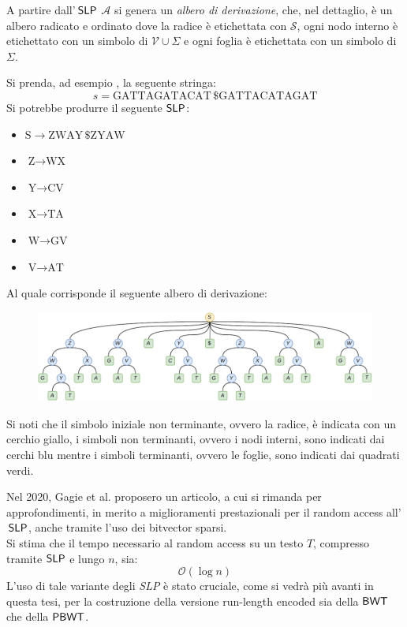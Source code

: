 A partire dall'$\,\mbox{\rm {\sf SLP}}$ $\mathcal{A}$ si genera un \textit{albero
  di derivazione}, che, nel dettaglio, è un albero radicato e ordinato
dove la radice è etichettata con $\mathcal{S}$, ogni nodo
  interno è etichettato con un simbolo di $\mathcal{V}\cup\Sigma$ e ogni foglia
è etichettata con un simbolo di $\Sigma$.
\begin{esempio}
  \label{ese:slpgagie}
  Si prenda, ad esempio \cite{slpgagie}, la seguente stringa:
  \[s=\mbox{GATTAGATACAT}\,\$\mbox{GATTACATAGAT}\]
  Si potrebbe produrre il seguente $\mbox{\rm {\sf SLP}}$:
  \begin{multicols}{3}
    \begin{itemize}
      \item $\mbox{S}\to \mbox{ZWAY}\,\$\mbox{ZYAW}$
      \item $\mbox{Z}\to \mbox{WX}$
      \item $\mbox{Y}\to \mbox{CV}$
      \item $\mbox{X}\to \mbox{TA}$
      \item $\mbox{W}\to \mbox{GV}$
      \item $\mbox{V}\to \mbox{AT}$
    \end{itemize}
  \end{multicols}
  Al quale corrisponde il seguente albero di derivazione:
  \begin{figure}[H]
    \centering
    \includegraphics[width=\textwidth]{img/slpgagie.pdf}
  \end{figure}
  Si noti che il simbolo
  iniziale non terminante, ovvero la radice, è indicata con un cerchio giallo, i
  simboli non terminanti, ovvero i nodi interni, sono indicati dai cerchi blu
  mentre i simboli terminanti, ovvero le foglie, sono indicati dai quadrati
  verdi.
\end{esempio}
Nel 2020, Gagie et al. \cite{slpgagie} 
proposero un articolo, a cui si rimanda per approfondimenti, in merito a
miglioramenti prestazionali per il random access all'$\,\mbox{\rm {\sf SLP}}$,
anche tramite l'uso dei bitvector sparsi.\\
Si stima che il tempo necessario al random access su un testo $T$, compresso
tramite $\mbox{\rm {\sf SLP}}$ e lungo $n$, sia: 
\begin{equation}
  \label{eq:slptime}
  \mathcal{O}\left(\log n\right)
\end{equation}
L'uso di tale variante degli \textit{SLP} è stato cruciale, come si vedrà più
avanti in questa tesi, per la costruzione della versione run-length encoded sia
della $\mbox{\rm {\sf BWT}}$ che della $\mbox{\rm {\sf PBWT}}$.
